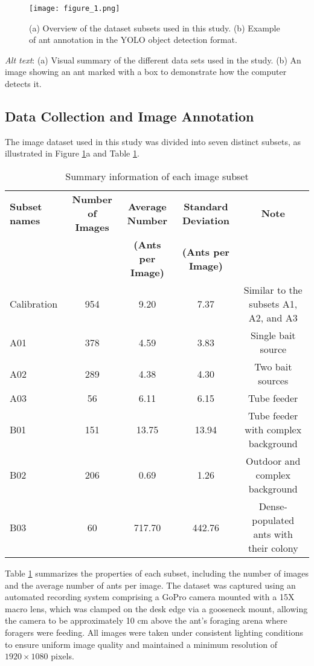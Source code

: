 \begin{figure}[H]
    \centering
    \texttt{[image: figure\_1.png]}
    \caption{(a) Overview of the dataset subsets used in this study. (b) Example of ant annotation in the YOLO object detection format.}
    \label{fig:figure1}
\end{figure}

\textit{Alt text}: (a) Visual summary of the different data sets used in the study. (b) An image showing an ant marked with a box to demonstrate how the computer detects it.

\subsection{Data Collection and Image Annotation}

The image dataset used in this study was divided into seven distinct subsets, as illustrated in Figure \ref{fig:figure1}a and Table \ref{table1}.

\begin{table}[H]
    \centering
    \caption{Summary information of each image subset}
    \label{table1}
    \small %
    \begin{tabular}{lcccc}
        \toprule
        \textbf{Subset names} & \textbf{Number of Images} & \textbf{Average Number} & \textbf{Standard Deviation} & \textbf{Note} \\
        & & \textbf{(Ants per Image)} & \textbf{(Ants per Image)} & \\
        \midrule
        Calibration & 954 & 9.20 & 7.37 & Similar to the subsets A1, A2, and A3 \\
        A01 & 378 & 4.59 & 3.83 & Single bait source \\
        A02 & 289 & 4.38 & 4.30 & Two bait sources \\
        A03 & 56 & 6.11 & 6.15 & Tube feeder \\
        B01 & 151 & 13.75 & 13.94 & Tube feeder with complex background \\
        B02 & 206 & 0.69 & 1.26 & Outdoor and complex background \\
        B03 & 60 & 717.70 & 442.76 & Dense-populated ants with their colony \\
        \bottomrule
    \end{tabular}
\end{table}

Table \ref{table1} summarizes the properties of each subset, including the number of images and the average number of ants per image. The dataset was captured using an automated recording system comprising a GoPro camera mounted with a 15X macro lens, which was clamped on the desk edge via a gooseneck mount, allowing the camera to be approximately 10 cm above the ant's foraging arena where foragers were feeding. All images were taken under consistent lighting conditions to ensure uniform image quality and maintained a minimum resolution of $1920 \times 1080$ pixels.

